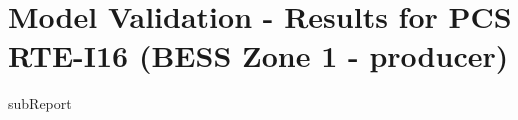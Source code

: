 




    \section{Model Validation - Results for PCS RTE-I16 (BESS Zone 1 - {{producer}})}

    {{subReport}}
    \newpage

